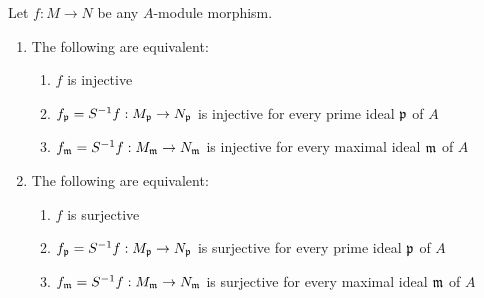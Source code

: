 \begin{proposition}
	Let $f: M \to N$ be any $A$-module morphism.
	\begin{enumerate}
		\item The following are equivalent:
			\begin{enumerate}
				\item $f$ is injective
				\item $f_{\mathfrak{p}} = S^{-1} f: M_{\mathfrak{p}} \to N_{\mathfrak{p}}$ is injective for every prime ideal $\mathfrak{p}$ of $A$
				\item $f_{\mathfrak{m}} = S^{-1} f: M_{\mathfrak{m}} \to N_{\mathfrak{m}}$ is injective for every maximal ideal $\mathfrak{m}$ of $A$
			\end{enumerate}
		\item The following are equivalent:
		\begin{enumerate}
			\item $f$ is surjective
			\item $f_{\mathfrak{p}} = S^{-1} f: M_{\mathfrak{p}} \to N_{\mathfrak{p}}$ is surjective for every prime ideal $\mathfrak{p}$ of $A$
			\item $f_{\mathfrak{m}} = S^{-1} f: M_{\mathfrak{m}} \to N_{\mathfrak{m}}$ is surjective for every maximal ideal $\mathfrak{m}$ of $A$
		\end{enumerate}
	\end{enumerate}
\end{proposition}

